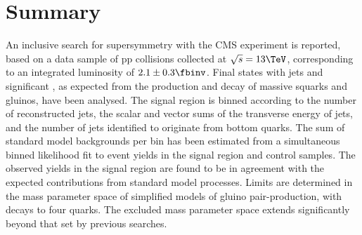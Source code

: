 \section{Summary}
\label{sec:summary}

An inclusive search for supersymmetry with the CMS experiment is
reported, based on a data sample of pp collisions collected at
$\sqrt{s} = 13\TeV$, corresponding to an integrated luminosity of $2.1
\pm 0.3 \fbinv$. Final states with jets and significant \met, as
expected from the production and decay of massive squarks and gluinos,
have been analysed.  The signal region is binned according to the
number of reconstructed jets, the scalar and vector sums of the
transverse energy of jets, and the number of jets identified to
originate from bottom quarks. The sum of standard model backgrounds
per bin has been estimated from a simultaneous binned likelihood fit
to event yields in the signal region and control samples.  The
observed yields in the signal region are found to be in agreement with
the expected contributions from standard model processes. Limits are
determined in the mass parameter space of simplified models of gluino
pair-production, with decays to four quarks.  The excluded mass
parameter space extends significantly beyond that set by previous
searches.

